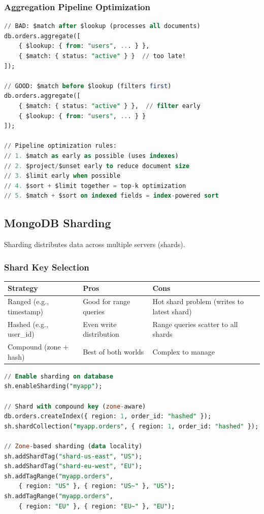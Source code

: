 \documentclass[12pt,a4paper]{article}
\begin{document}
\subsubsection{Aggregation Pipeline Optimization}

\begin{lstlisting}[language=SQL, caption={Aggregation optimization}]
// BAD: $match after $lookup (processes all documents)
db.orders.aggregate([
    { $lookup: { from: "users", ... } },
    { $match: { status: "active" } }  // too late!
]);

// GOOD: $match before $lookup (filters first)
db.orders.aggregate([
    { $match: { status: "active" } },  // filter early
    { $lookup: { from: "users", ... } }
]);

// Pipeline optimization rules:
// 1. $match as early as possible (uses indexes)
// 2. $project/$unset early to reduce document size
// 3. $limit early when possible
// 4. $sort + $limit together = top-k optimization
// 5. $match + $sort on indexed fields = index-powered sort
\end{lstlisting}

\subsection{MongoDB Sharding}

Sharding distributes data across multiple servers (shards).

\subsubsection{Shard Key Selection}

\begin{center}
\begin{tabular}{lp{4cm}p{4cm}}
\toprule
\textbf{Strategy} & \textbf{Pros} & \textbf{Cons} \\
\midrule
Ranged (e.g., timestamp) & Good for range queries & Hot shard problem (writes to latest shard) \\
Hashed (e.g., user\_id) & Even write distribution & Range queries scatter to all shards \\
Compound (zone + hash) & Best of both worlds & Complex to manage \\
\bottomrule
\end{tabular}
\end{center}

\begin{lstlisting}[language=SQL, caption={Sharding setup}]
// Enable sharding on database
sh.enableSharding("myapp");

// Shard with compound key (zone-aware)
db.orders.createIndex({ region: 1, order_id: "hashed" });
sh.shardCollection("myapp.orders", { region: 1, order_id: "hashed" });

// Zone-based sharding (data locality)
sh.addShardTag("shard-us-east", "US");
sh.addShardTag("shard-eu-west", "EU");
sh.addTagRange("myapp.orders",
    { region: "US" }, { region: "US~" }, "US");
sh.addTagRange("myapp.orders",
    { region: "EU" }, { region: "EU~" }, "EU");
\end{lstlisting}
\end{document}
